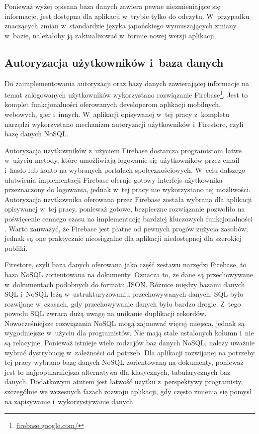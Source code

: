 \documentclass[a4paper,twoside,12pt]{book}
\begin{document}
Ponieważ wyżej opisana baza danych zawiera pewne niezmieniające się informacje, jest dostępna dla aplikacji w~trybie tylko do odczytu. W~przypadku znaczących zmian w~standardzie języka japońskiego wymuszających zmiany w~bazie, należałoby ją zaktualizować w~formie nowej wersji aplikacji.

\subsection{Autoryzacja użytkowników i~baza danych}
Do zaimplementowania autoryzacji oraz bazy danych zawierającej informacje na temat zalogowanych użytkowników wykorzystano rozwiązanie Firebase\footnote{\url{firebase.google.com/}}. Jest to komplet funkcjonalności oferowanych developerom aplikacji mobilnych, webowych, gier i~innych. W~aplikacji opisywanej w~tej pracy z~kompletu narzędzi wykorzystano mechanizm autoryzacji użytkowników i~Firestore, czyli bazę danych NoSQL. 

Autoryzacja użytkowników z~użyciem Firebase dostarcza programistom łatwe w~użyciu metody, które umożliwiają logowanie się użytkowników przez email i~hasło lub konto na wybranych portalach społecznościowych. W~celu dalszego ułatwienia implementacji Firebase oferuje gotowy interfejs użytkownika przeznaczony do logowania, jednak w~tej pracy nie wykorzystano tej możliwości. Autoryzacja użytkownika oferowana przez Firebase została wybrana dla aplikacji opisywanej w~tej pracy, ponieważ gotowe, bezpieczne rozwiązanie pozwoliło na poświęcenie cennego czasu na implementację bardziej kluczowych funkcjonalności \cite{bib:ksiazkaFirebase}. Warto zauważyć, że Firebase jest płatne od pewnych progów zużycia zasobów, jednak są one praktycznie nieosiągalne dla aplikacji niedostępnej dla szerokiej publiki.

Firestore, czyli baza danych oferowana jako część zestawu narzędzi Firebase, to baza NoSQL zorientowana na dokumenty. Oznacza to, że dane są przechowywane w~dokumentach podobnych do formatu JSON. Różnice między bazami danych SQL i~NoSQL leżą w~ustrukturyzowaniu przechowywanych danych. SQL było rozwijane w~czasach, gdy przechowywanie danych było bardzo drogie. Z~tego powodu SQL zwraca dużą uwagę na unikanie duplikacji rekordów. Nowocześniejsze rozwiązania NoSQL mogą zajmować więcej miejsca, jednak są wygodniejsze w~użyciu dla programistów. Nie mają stale ustalonych kolumn i~nie są relacyjne. Ponieważ istnieje wiele rodzajów baz danych NoSQL, należy uważnie wybrać dystrybucję w~zależności od potrzeb. Dla aplikacji rozwijanej na potrzeby tej pracy wybrano bazę danych NoSQL zorientowaną na dokumenty, ponieważ jest to najpopularniejsza alternatywa dla klasycznych, tabularycznych baz danych. Dodatkowym atutem jest łatwość użytku z~perspektywy programisty, szczególnie we wczesnych fazach rozwoju aplikacji, gdy często zmienia się pomysł na zapisywanie i~wykorzystywanie danych. 
\end{document}
